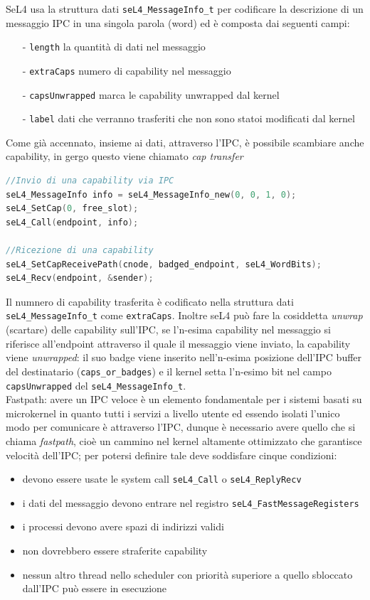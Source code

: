 SeL4 usa la struttura dati \texttt{seL4\_MessageInfo\_t} per codificare la descrizione di un messaggio IPC in una singola parola (word) ed è composta dai seguenti campi:
\begin{itemize}
	\item[-] \texttt{length} la quantità di dati nel messaggio
	\item[-] \texttt{extraCaps} numero di capability nel messaggio 
	\item[-] \texttt{capsUnwrapped} marca le capability unwrapped dal kernel
	\item[-] \texttt{label} dati che verranno trasferiti che non sono statoi modificati dal kernel
\end{itemize}
Come già accennato, insieme ai dati, attraverso l'IPC, è possibile scambiare anche capability, in gergo questo viene chiamato \textit{cap transfer}
\begin{lstlisting}[language=C++]
//Invio di una capability via IPC
seL4_MessageInfo info = seL4_MessageInfo_new(0, 0, 1, 0);
seL4_SetCap(0, free_slot);
seL4_Call(endpoint, info);

//Ricezione di una capability
seL4_SetCapReceivePath(cnode, badged_endpoint, seL4_WordBits);
seL4_Recv(endpoint, &sender);
\end{lstlisting}
Il numnero di capability trasferita è codificato nella struttura dati \texttt{seL4\_MessageInfo\_t} come \texttt{extraCaps}.
Inoltre seL4 può fare la cosiddetta \textit{unwrap} (scartare) delle capability sull'IPC, se l'n-esima capability nel messaggio si riferisce all'endpoint attraverso il quale il messaggio viene inviato, la capability viene \textit{unwrapped}: il suo badge viene inserito nell'n-esima posizione dell'IPC buffer del destinatario (\texttt{caps\_or\_badges}) e il kernel setta l'n-esimo bit nel campo \texttt{capsUnwrapped} del \texttt{seL4\_MessageInfo\_t}.\\
Fastpath: avere un IPC veloce è un elemento fondamentale per i sistemi basati su microkernel in quanto tutti i servizi a livello utente ed essendo isolati l'unico modo per comunicare è attraverso l'IPC, dunque è necessario avere quello che si chiama \textit{fastpath}, cioè un cammino nel kernel altamente ottimizzato che garantisce velocità dell'IPC; per potersi definire tale deve soddisfare cinque condizioni:
\begin{itemize}
	\item devono essere usate le system call \texttt{seL4\_Call} o \texttt{seL4\_ReplyRecv}
	\item i dati del messaggio devono entrare nel registro \texttt{seL4\_FastMessageRegisters}
	\item i processi devono avere spazi di indirizzi validi
	\item non dovrebbero essere straferite capability 
	\item nessun altro thread nello scheduler con priorità superiore a quello sbloccato dall'IPC può essere in esecuzione
\end{itemize}
